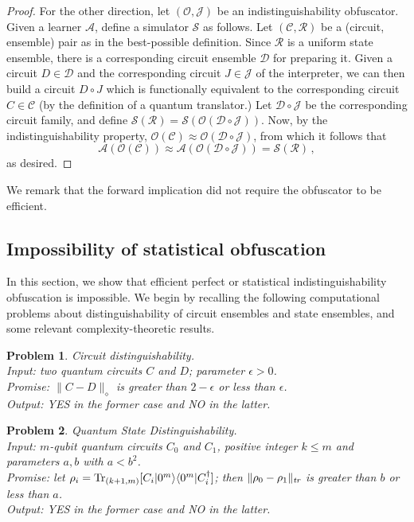 \documentclass[11pt]{article}
\DeclareMathOperator{\tr}{Tr}
\numberwithin{equation}{section}
\newtheorem{problem}{Problem}
\newcommand{\algo}{\mathcal}
\begin{document}
{\begin{proof}
For the other direction, let $(\algo O, \algo J)$ be an indistinguishability obfuscator. Given a learner $\algo A$, define a simulator $\algo S$ as follows. Let $(\mathcal C, \mathcal R)$ be a (circuit, ensemble) pair as in the best-possible definition. Since $\mathcal R$ is a uniform state ensemble, there is a corresponding circuit ensemble $\mathcal D$ for preparing it. Given a circuit $D \in \mathcal D$ and the corresponding circuit $J \in \algo J$ of the interpreter, we can then build a circuit $D \circ J$ which is functionally equivalent to the corresponding circuit $C \in \mathcal C$ (by the definition of a quantum translator.) Let $\mathcal {D \circ J}$ be the corresponding circuit family, and define $\algo S ( \mathcal R ) = \algo S ( \algo O ( \mathcal {D \circ J}))$. Now, by the indistinguishability property, $\algo O(\mathcal C) \approx \algo O (\mathcal {D \circ J})$, from which it follows that 
$$
\algo A( \algo O(\mathcal C)) \approx \algo A( \algo O(\mathcal {D \circ J})) = \algo S(\mathcal R)\,,
$$
as desired.
\end{proof}

We remark that the forward implication did not require the obfuscator to be efficient.

\subsection{Impossibility of statistical obfuscation}

In this section, we show that efficient perfect or statistical indistinguishability obfuscation is impossible. We begin by recalling the following computational problems about distinguishability of circuit ensembles and state ensembles, and some relevant complexity-theoretic results.

\begin{problem} \textsf{\emph{Circuit distinguishability}}.\\
\indent Input: two quantum circuits $C$ and $D$; parameter $\epsilon > 0$. \\
\indent Promise: $\|C - D\|_\diamond$ is greater than $2 - \epsilon$ or less than $\epsilon$.\\
\indent Output: YES in the former case and NO in the latter.
\end{problem}

\begin{problem} \textsf{\emph{Quantum State Distinguishability}}.\\
\indent Input: $m$-qubit quantum circuits $C_0$ and $C_1$, positive integer $k \leq m$ and parameters $a,b$ with $a<b^2$.\\
\indent Promise: let $\rho_i = \tr_{(k+1, m)}[C_i\ket{0^m}\bra{0^m}C_i^\dagger]$; then $\|\rho_0 - \rho_1\|_\emph{tr}$ is greater than $b$ or less than $a$.\\
\indent Output: YES in the former case and NO in the latter.
\end{problem}

}
\end{document}
